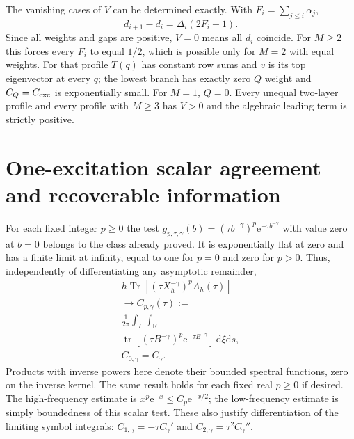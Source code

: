 \documentclass[aps,pra,reprint,superscriptaddress,longbibliography]{revtex4-2}
\newcommand{\Tr}{\operatorname{Tr}}
\newcommand{\dd}{\mathrm d}
\newcommand{\ee}{\mathrm e}
\begin{document}
The vanishing cases of $V$ can be determined exactly.  With
$F_i=\sum_{j\leq i}\alpha_j$,
\[
 d_{i+1}-d_i=\Delta_i(2F_i-1).
\]
Since all weights and gaps are positive, $V=0$ means all $d_i$ coincide.
For $M\geq2$ this forces every $F_i$ to equal $1/2$, which is possible
only for $M=2$ with equal weights.  For that profile $T(q)$ has constant
row sums and $v$ is its top eigenvector at every $q$; the lowest branch
has exactly zero $Q$ weight and $C_Q=C_{\rm exc}$ is exponentially
small.  For $M=1$, $Q=0$.  Every unequal two-layer profile and every
profile with $M\geq3$ has $V>0$ and the algebraic leading term is
strictly positive.

\section{One-excitation scalar agreement and recoverable information}
\label{sgt:geo:information-section}

For each fixed integer $p\geq0$ the test
$g_{p,\tau,\gamma}(b)=(\tau b^{-\gamma})^p\ee^{-\tau b^{-\gamma}}$
with value zero at $b=0$ belongs to the class already proved.
It is exponentially flat at zero and has a finite limit at infinity,
equal to one for $p=0$ and zero for $p>0$.
Thus, independently of differentiating any asymptotic remainder,
\begin{equation}
\begin{gathered}
 h\Tr[(\tau X_h^{-\gamma})^pA_h(\tau)]
\\
 \longrightarrow C_{p,\gamma}(\tau):=\\
 \frac1{2\pi}\int_\Gamma\int_{\mathbb R}
\\
 \operatorname{tr}[(\tau B^{-\gamma})^p\ee^{-\tau B^{-\gamma}}]
                         \,\dd\xi\dd s,
 \\
 C_{0,\gamma}=C_\gamma.
 \label{sgt:geo:weighted-heat}
\end{gathered}
\end{equation}
Products with inverse powers here denote their bounded spectral
functions, zero on the inverse kernel.  The same result holds for
each fixed real $p\geq0$ if desired.  The high-frequency estimate is
$x^p\ee^{-x}\leq C_p\ee^{-x/2}$; the low-frequency estimate is simply
boundedness of this scalar test.  These also justify differentiation
of the limiting symbol integrals:
$C_{1,\gamma}=-\tau C_\gamma'$ and
$C_{2,\gamma}=\tau^2C_\gamma''$.
\end{document}
